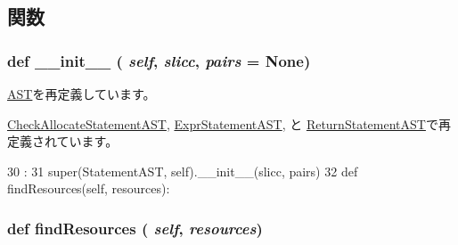 \subsection{関数}
\hypertarget{classslicc_1_1ast_1_1StatementAST_1_1StatementAST_ac775ee34451fdfa742b318538164070e}{
\subsubsection[{\_\-\_\-init\_\-\_\-}]{\setlength{\rightskip}{0pt plus 5cm}def \_\-\_\-init\_\-\_\- ( {\em self}, \/   {\em slicc}, \/   {\em pairs} = {\ttfamily None})}}
\label{classslicc_1_1ast_1_1StatementAST_1_1StatementAST_ac775ee34451fdfa742b318538164070e}


\hyperlink{classslicc_1_1ast_1_1AST_1_1AST_ac775ee34451fdfa742b318538164070e}{AST}を再定義しています。

\hyperlink{classslicc_1_1ast_1_1CheckAllocateStatementAST_1_1CheckAllocateStatementAST_ac775ee34451fdfa742b318538164070e}{CheckAllocateStatementAST}, \hyperlink{classslicc_1_1ast_1_1ExprStatementAST_1_1ExprStatementAST_ac775ee34451fdfa742b318538164070e}{ExprStatementAST}, と \hyperlink{classslicc_1_1ast_1_1ReturnStatementAST_1_1ReturnStatementAST_ac775ee34451fdfa742b318538164070e}{ReturnStatementAST}で再定義されています。


\begin{DoxyCode}
30                                          :
31         super(StatementAST, self).__init__(slicc, pairs)
32 
    def findResources(self, resources):
\end{DoxyCode}
\hypertarget{classslicc_1_1ast_1_1StatementAST_1_1StatementAST_abd195c795639b490ba2de4c1246105f1}{
\subsubsection[{findResources}]{\setlength{\rightskip}{0pt plus 5cm}def findResources ( {\em self}, \/   {\em resources})}}
\label{classslicc_1_1ast_1_1StatementAST_1_1StatementAST_abd195c795639b490ba2de4c1246105f1}


